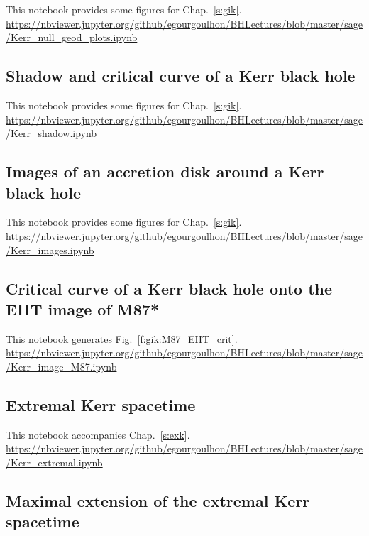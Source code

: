 This notebook provides some figures for Chap.~\ref{s:gik}.\\[1ex]
{\footnotesize
\url{https://nbviewer.jupyter.org/github/egourgoulhon/BHLectures/blob/master/sage/Kerr_null_geod_plots.ipynb}
}

\subsection{Shadow and critical curve of a Kerr black hole} \label{s:sam:Kerr_shadow}

This notebook provides some figures for Chap.~\ref{s:gik}.\\[1ex]
{\footnotesize
\url{https://nbviewer.jupyter.org/github/egourgoulhon/BHLectures/blob/master/sage/Kerr_shadow.ipynb}
}

\subsection{Images of an accretion disk around a Kerr black hole} \label{s:sam:Kerr_images}

This notebook provides some figures for Chap.~\ref{s:gik}.\\[1ex]
{\footnotesize
\url{https://nbviewer.jupyter.org/github/egourgoulhon/BHLectures/blob/master/sage/Kerr_images.ipynb}
}

\subsection{Critical curve of a Kerr black hole onto the EHT image of M87*} \label{s:sam:Kerr_image_M87}

This notebook generates Fig.~\ref{f:gik:M87_EHT_crit}.\\[1ex]
{\footnotesize
\url{https://nbviewer.jupyter.org/github/egourgoulhon/BHLectures/blob/master/sage/Kerr_image_M87.ipynb}
}


\subsection{Extremal Kerr spacetime} \label{s:sam:Kerr_extremal}

This notebook accompanies Chap.~\ref{s:exk}.\\[1ex]
{\footnotesize
\url{https://nbviewer.jupyter.org/github/egourgoulhon/BHLectures/blob/master/sage/Kerr_extremal.ipynb}
}

\subsection{Maximal extension of the extremal Kerr spacetime} \label{s:sam:Kerr_extremal_extended}


